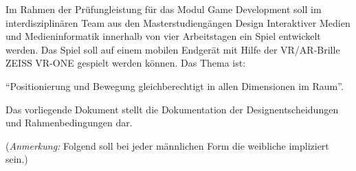Im Rahmen der Prüfungleistung für das Modul Game Development soll im interdisziplinären Team aus den Masterstudiengängen Design Interaktiver Medien und Medieninformatik innerhalb von vier Arbeitstagen ein Spiel entwickelt werden. Das Spiel soll auf einem mobilen Endgerät mit Hilfe der VR/AR-Brille ZEISS VR-ONE gespielt werden können. Das Thema ist: 

\enquote{Positionierung und Bewegung gleichberechtigt in allen Dimensionen im Raum}.

Das vorliegende Dokument stellt die Dokumentation der Designentscheidungen und Rahmenbedingungen dar.

(\emph{Anmerkung:} Folgend soll bei jeder männlichen Form die weibliche impliziert sein.)
